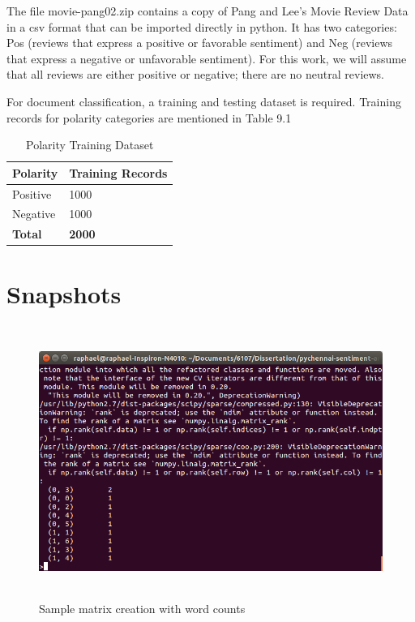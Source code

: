 \documentclass[oneside,a4paper,12pt]{pictreport}
\begin{document}
\par The file movie-pang02.zip contains a copy of Pang and Lee's Movie Review Data in a
csv format that can be imported directly in python. It has two categories: Pos 
(reviews that express a positive or favorable sentiment) and Neg (reviews 
that express a negative or unfavorable sentiment). For this work, we will assume that
all reviews are either positive or negative; there are no neutral reviews. 
\par For document classification, a training and testing dataset is required. 
Training records for polarity categories are mentioned in Table 9.1

\renewcommand{\arraystretch}{1.5}

\begin{table}[h!]
\centering
\caption{Polarity Training Dataset}
\label{my-label}
\begin{tabular}{|l|l|}
\hline
\textbf{Polarity} & \textbf{Training Records} \\ \hline
Positive          & 1000                      \\ \hline
Negative          & 1000                      \\ \hline

\textbf{Total}    & \textbf{2000}             \\ \hline
\end{tabular}
\end{table}

\newpage
\section{Snapshots}


\begin{figure}[!h]
\includegraphics[width=5.5in,height=3.5in]{screenshot2.png}
\caption{Sample matrix creation with word counts}
\end{figure}
\end{document}
